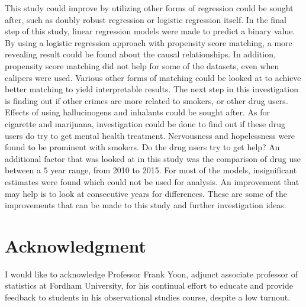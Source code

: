 \documentclass[a4paper, 10pt, conference]{ieeeconf}      %
\begin{document}
This study could improve by utilizing other forms of regression could be sought after, such as doubly robust regression or logistic regression itself. In the final step of this study, linear regression models were made to predict a binary value. By using a logistic regression approach with propensity score matching, a more revealing result could be found about the causal relationships. In addition, propensity score matching did not help for some of the datasets, even when calipers were used. Various other forms of matching could be looked at to achieve better matching to yield interpretable results. The next step in this investigation is finding out if other crimes are more related to smokers, or other drug users. Effects of using hallucinogens and inhalants could be sought after. As for cigarette and marijuana, investigation could be done to find out if these drug users do try to get mental health treatment. Nervousness and hopelessness were found to be prominent with smokers. Do the drug users try to get help? An additional factor that was looked at in this study was the comparison of drug use between a $5$ year range, from 2010 to 2015. For most of the models, insignificant estimates were found which could not be used for analysis. An improvement that may help is to look at consecutive years for differences. These are some of the improvements that can be made to this study and further investigation ideas. 

\section*{Acknowledgment}

I would like to acknowledge Professor Frank Yoon, adjunct associate professor of statistics at Fordham University, for his continual effort to educate and provide feedback to students in his observational studies course, despite a low turnout. 
\end{document}
